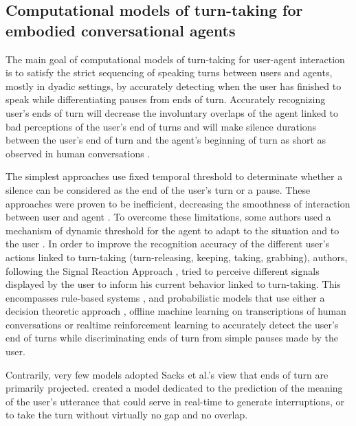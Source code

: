 \subsection{Computational models of turn-taking for embodied conversational agents}
\label{comp_modelling}

The main goal of computational models of turn-taking for user-agent interaction is to satisfy the strict sequencing of speaking turns between users and agents, mostly in
dyadic settings, by accurately detecting when the user has finished to speak while differentiating pauses from ends of turn. Accurately recognizing user's ends of turn
will decrease the involuntary overlaps of the agent linked to bad perceptions of the user's end of turns and will make silence durations between the user's end of turn and the agent's beginning of turn as short as observed
in human conversations \citep{balentine_debouncing_1997,ward_root_2005,raux_optimizing_2012,jonsdottir_distributed_2013}.

The simplest approaches use fixed temporal threshold to determinate whether a silence can be considered as the end of the user's turn or a pause. 
These approaches were proven to be inefficient, decreasing the smoothness of interaction between user and agent \citep{ward_root_2005}. 
To overcome these limitations, some authors used a mechanism of dynamic threshold for the agent to adapt to the
situation and to the user \citep{bohus_decisions_2011,witt_modeling_2014}. In order to improve the recognition accuracy of the different user's actions linked to turn-taking (turn-releasing, keeping, taking, grabbing), authors, following the Signal Reaction Approach \citep{duncan_signals_1972}, tried to perceive different signals displayed by the user to inform his current behavior linked to turn-taking.   
This encompasses rule-based systems \citep{cassell_embodiment_1999,thorisson_natural_2002}, and probabilistic
models that use either a decision theoretic approach \citep{bohus_decisions_2011,raux_optimizing_2012}, offline machine learning on transcriptions of human conversations \citep{schlangen_reaction_2006,huang_multimodal_2011} or realtime reinforcement learning \citep{jonsdottir_distributed_2013} to accurately detect the user's end of turns while discriminating ends of turn from simple pauses made by the user. 

Contrarily, very few models adopted Sacks et al.'s view that ends of turn are primarily projected. \citep{de_vault_incremental_2011} created a model dedicated to the prediction of the meaning of the user's utterance that could serve in real-time to generate interruptions, or to take the turn without virtually no gap and no overlap.

